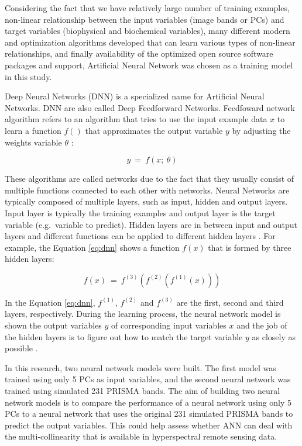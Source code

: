 \documentclass[a4paper, twoside]{templates/ociamthesis}
\begin{document}
Considering the fact that we have relatively large number of training examples, non-linear relationship between the input variables (image bands or PCs) and target variables (biophysical and biochemical variables), many different modern and optimization algorithms developed that can learn various types of non-linear relationships, and finally availability of the optimized open source software packages and support, Artificial Neural Network was chosen as a training model in this study.

Deep Neural Networks (DNN) is a specialized name for Artificial Neural Networks. DNN are also called Deep Feedforward Networks. Feedfoward network algorithm refers to an algorithm that tries to use the input example data \(x\) to learn a function \(f()\) that approximates the output variable \(y\) by adjusting the weights variable \(\theta\) \citep{goodfellow2016deep}:

\begin{equation}
y\ =\ f\left(x;\ \theta\right)
\label{eq:feed}
\end{equation}

These algorithms are called networks due to the fact that they usually consist of multiple functions connected to each other with networks. Neural Networks are typically composed of multiple layers, such as input, hidden and output layers. Input layer is typically the training examples and output layer is the target variable (e.g.~variable to predict). Hidden layers are in between input and output layers and different functions can be applied to different hidden layers \citep{goodfellow2016deep}. For example, the Equation \eqref{eq:dnn} shows a function \(f(x)\) that is formed by three hidden layers:

\begin{equation}
f\left(x\right)\ =\ f^{\left(3\right)}\left(f^{\left(2\right)}\left(f^{\left(1\right)}\left(x\right)\right)\right)
\label{eq:dnn}
\end{equation}

In the Equation \eqref{eq:dnn}, \(f^{(1)}\), \(f^{(2)}\) and \(f^{(3)}\) are the first, second and third layers, respectively. During the learning process, the neural network model is shown the output variables \(y\) of corresponding input variables \(x\) and the job of the hidden layers is to figure out how to match the target variable \(y\) as closely as possible \citep{goodfellow2016deep}.

In this research, two neural network models were built. The first model was trained using only 5 PCs as input variables, and the second neural network was trained using simulated 231 PRISMA bands. The aim of building two neural network models is to compare the performance of a neural network using only 5 PCs to a neural network that uses the original 231 simulated PRISMA bands to predict the output variables. This could help assess whether ANN can deal with the multi-collinearity that is available in hyperspectral remote sensing data.
\end{document}
